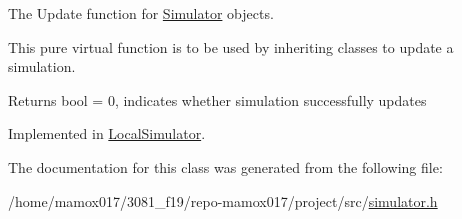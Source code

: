 The Update function for \hyperlink{classSimulator}{Simulator} objects. 

This pure virtual function is to be used by inheriting classes to update a simulation.

\begin{DoxyReturn}{Returns}
bool = 0, indicates whether simulation successfully updates 
\end{DoxyReturn}


Implemented in \hyperlink{classLocalSimulator_ac98ba1a401ad204dd5169934adb02684}{Local\+Simulator}.



The documentation for this class was generated from the following file\+:\begin{DoxyCompactItemize}
\item 
/home/mamox017/3081\+\_\+f19/repo-\/mamox017/project/src/\hyperlink{simulator_8h}{simulator.\+h}\end{DoxyCompactItemize}
